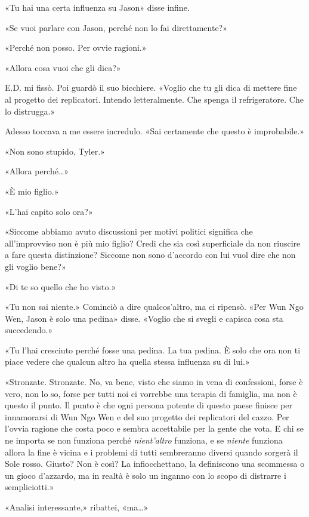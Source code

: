 «Tu hai una certa influenza su Jason» disse infine.

«Se vuoi parlare con Jason, perché non lo fai direttamente?»

«Perché non posso. Per ovvie ragioni.»

«Allora cosa vuoi che gli dica?»

E.D. mi fissò. Poi guardò il suo bicchiere. «Voglio che tu gli dica di
mettere fine al progetto dei replicatori. Intendo letteralmente. Che
spenga il refrigeratore. Che lo distrugga.»

Adesso toccava a me essere incredulo. «Sai certamente che questo è
improbabile.»

«Non sono stupido, Tyler.»

«Allora perché\ldots»

«È mio figlio.»

«L'hai capito solo ora?»

«Siccome abbiamo avuto discussioni per motivi politici significa che
all'improvviso non è più mio figlio? Credi che sia così superficiale da
non riuscire a fare questa distinzione? Siccome non sono d'accordo con
lui vuol dire che non gli voglio bene?»

«Di te so quello che ho visto.»

«Tu non sai niente.» Cominciò a dire qualcos'altro, ma ci ripensò. «Per
Wun Ngo Wen, Jason è solo una pedina» disse. «Voglio che si svegli e
capisca cosa sta succedendo.»

«Tu l'hai cresciuto perché fosse una pedina. La tua pedina. È solo che
ora non ti piace vedere che qualcun altro ha quella stessa influenza su
di lui.»

«Stronzate. Stronzate. No, va bene, visto che siamo in vena di
confessioni, forse è vero, non lo so, forse per tutti noi ci vorrebbe
una terapia di famiglia, ma non è questo il punto. Il punto è che ogni
persona potente di questo paese finisce per innamorarsi di Wun Ngo Wen e
del suo progetto dei replicatori del cazzo. Per l'ovvia ragione che
costa poco e sembra accettabile per la gente che vota. E chi se ne
importa se non funziona perché \emph{nient'altro} funziona, e se
\emph{niente} funziona allora la fine è vicina e i problemi di tutti
sembreranno diversi quando sorgerà il Sole rosso. Giusto? Non è così? La
infiocchettano, la definiscono una scommessa o un gioco d'azzardo, ma in
realtà è solo un inganno con lo scopo di distrarre i sempliciotti.»

«Analisi interessante,» ribattei, «ma\ldots»

